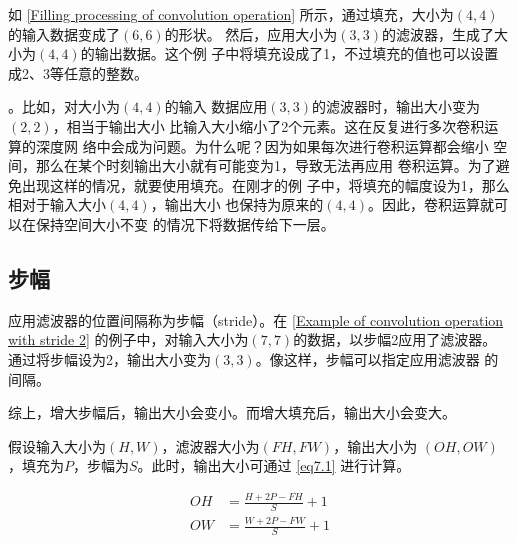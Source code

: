 如 \autoref{Filling processing of convolution operation} 所示，通过填充，大小为$(4, 4)$的输入数据变成了$(6, 6)$的形状。
然后，应用大小为$(3, 3)$的滤波器，生成了大小为$(4, 4)$的输出数据。这个例
子中将填充设成了1，不过填充的值也可以设置成2、3等任意的整数。

\begin{tcolorbox}
    。比如，对大小为$(4, 4)$的输入
    数据应用$(3, 3)$的滤波器时，输出大小变为$(2, 2)$，相当于输出大小
    比输入大小缩小了2个元素。这在反复进行多次卷积运算的深度网
    络中会成为问题。为什么呢？因为如果每次进行卷积运算都会缩小
    空间，那么在某个时刻输出大小就有可能变为1，导致无法再应用
    卷积运算。为了避免出现这样的情况，就要使用填充。在刚才的例
    子中，将填充的幅度设为1，那么相对于输入大小$(4, 4)$，输出大小
    也保持为原来的$(4, 4)$。因此，卷积运算就可以在保持空间大小不变
    的情况下将数据传给下一层。
\end{tcolorbox}

\subsection{步幅}
应用滤波器的位置间隔称为步幅（stride）。在 \autoref{Example of convolution operation with stride 2} 的例子中，对输入大小为$(7, 7)$的数据，以步幅2应用了滤波器。
通过将步幅设为2，输出大小变为$(3, 3)$。像这样，步幅可以指定应用滤波器
的间隔。


综上，增大步幅后，输出大小会变小。而增大填充后，输出大小会变大。

假设输入大小为$(H, W)$，滤波器大小为$(FH, FW)$，输出大小为
$(OH, OW)$，填充为$P$，步幅为$S$。此时，输出大小可通过 \autoref{eq7.1} 进行计算。

\begin{equation}
    \label{eq7.1}
    \begin{aligned}
        OH & =\frac{H+2P-FH}{S}+1 \\
        OW & =\frac{W+2P-FW}{S}+1 \\
    \end{aligned}
\end{equation}